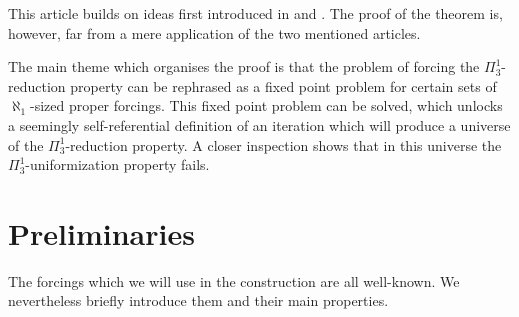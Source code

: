 \documentclass[a4paper,11pt]{article}
\begin{document}
This article builds on ideas first introduced in \cite{H} and \cite{H2}. The proof of the theorem is, however, far from a mere application of the two mentioned articles.

The main theme which organises the proof is that the problem of forcing the $\Pi^1_3$-reduction property can be rephrased as a fixed point problem for certain sets of $\aleph_1$-sized proper forcings. This fixed point problem can be solved, which unlocks a seemingly self-referential definition of an iteration which will produce a universe of the $\Pi^1_3$-reduction property. A closer inspection shows that in this universe the $\Pi^1_3$-uniformization property fails.

\section{Preliminaries}

The forcings which we will use in the construction are all well-known. We nevertheless briefly introduce them and their main properties. 
\end{document}
